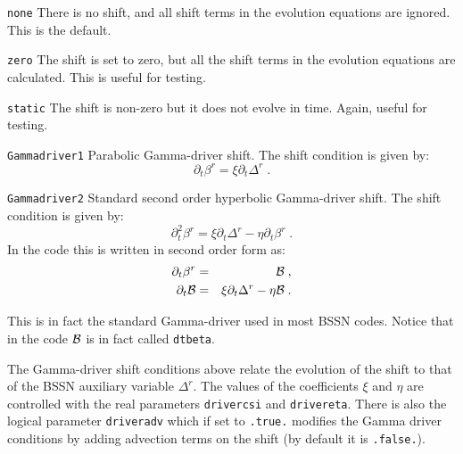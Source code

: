 \documentclass[12pt]{article}
\begin{document}
\begin{list}{}{
\setlength{\leftmargin}{45mm}
\setlength{\labelsep}{10mm}
\setlength{\labelwidth}{30mm}}

\item[\texttt{none}] There is no shift, and all shift terms in the
  evolution equations are ignored.  This is the default.

\item[\texttt{zero}] The shift is set to zero, but all the shift terms
  in the evolution equations are calculated.  This is useful for
  testing.

\item[\texttt{static}] The shift is non-zero but it does not evolve in
  time. Again, useful for testing.

\item[\texttt{Gammadriver1}] Parabolic Gamma-driver shift.  The shift
  condition is given by:
\begin{equation}
\partial_t \beta^r = \xi \partial_t \Delta^r \; .
\end{equation}

\item[\texttt{Gammadriver2}] Standard second order hyperbolic
  Gamma-driver shift.  The shift condition is given by:
\begin{equation}
\partial^2_t \beta^r = \xi \partial_t \Delta^r - \eta \partial_t \beta^r \; .
\end{equation}
In the code this is written in second order form as:
\begin{eqnarray}
\partial_t \beta^r &=& \cal{B} \; , \\
\partial_t \cal{B} &=& \xi \partial_t \Delta^r - \eta \cal{B} \; .
\end{eqnarray}

This is in fact the standard Gamma-driver used in most BSSN codes.
Notice that in the code ${\cal B}$ is in fact called \texttt{dtbeta}.

\end{list}

\vspace{3mm}

The Gamma-driver shift conditions above relate the evolution of the
shift to that of the BSSN auxiliary variable $\Delta^r$. The values of
the coefficients $\xi$ and $\eta$ are controlled with the real
parameters \texttt{drivercsi} and \texttt{drivereta}.  There is also
the logical parameter \texttt{driveradv} which if set to
\texttt{.true.}  modifies the Gamma driver conditions by adding
advection terms on the shift (by default it is \texttt{.false.}). \\
\end{document}
